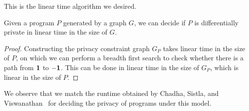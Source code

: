 This is the linear time algorithm we desired. 

\begin{thm}\label{LinearTimeDecidingPrograms}
    Given a program $P$ generated by a graph $G$, we can decide if $P$ is differentially private in linear time in the size of $G$.
\end{thm}

\begin{proof}
    Constructing the privacy constraint graph $G_P$ takes linear time in the size of $P$, on which we can perform a breadth first search to check whether there is a path from $\bf 1$ to $\bf -1$. This can be done in linear time in the size of $G_P$, which is linear in the size of $P$.
\end{proof}

We observe that we match the runtime obtained by Chadha, Sistla, and Viswanathan~\cite{chadhaLinearTimeDecidability2021} for deciding the privacy of programs under this model. 



